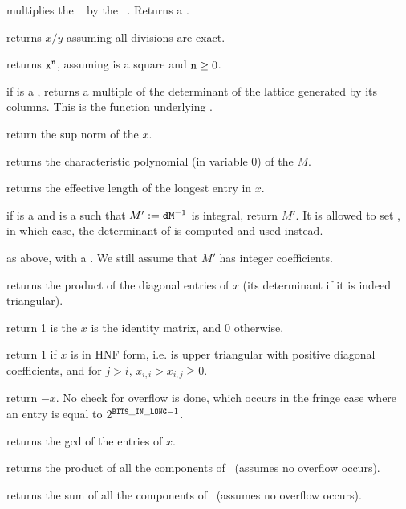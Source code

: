  multiplies the ~
by the ~. Returns a .

 returns $x/y$ assuming all divisions
are exact.

 returns ${\tt x}^{\tt n}$, assuming 
is a square  and ${\tt n}\geq 0$.

 if  is a , returns a multiple of
the determinant of the lattice generated by its columns. This is the function
underlying .

 return the sup norm of the  $x$.

 returns the characteristic polynomial (in
variable $0$) of the  $M$.

 returns the effective length of the longest
entry in $x$.

 if  is a  and 
is a  such that $M' := {\tt d}{\tt M}^{-1}$ is integral,
return $M'$. It is allowed to set , in which case, the
determinant of  is computed and used instead.

 as above, with  a . We
still assume that $M'$ has integer coefficients.

 returns the product of the diagonal
entries of $x$ (its determinant if it is indeed triangular).

 return 1 is the  $x$ is the
identity matrix, and 0 otherwise.

 return $1$ if $x$ is in HNF form, i.e. is upper
triangular with positive diagonal coefficients, and  for $j>i$,
$x_{i,i}>x_{i,j} \ge 0$.


 return $-x$. No check for overflow is done, which
occurs in the fringe case where an entry is equal to $2^{{\tt BITS\_IN\_LONG}-1}$.

 returns the gcd of the entries of $x$.

 returns the product of all the components
of~ (assumes no overflow occurs).

 returns the sum of all the components
of~ (assumes no overflow occurs).

